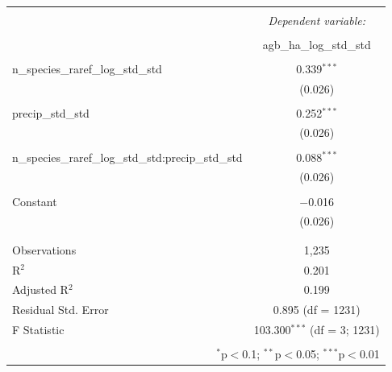 
\begin{table}[!htbp] \centering 
  \caption{} 
  \label{mois_div_int_mod} 
\begin{tabular}{@{\extracolsep{5pt}}lc} 
\\[-1.8ex]\hline 
\hline \\[-1.8ex] 
 & \multicolumn{1}{c}{\textit{Dependent variable:}} \\ 
\cline{2-2} 
\\[-1.8ex] & agb\_ha\_log\_std\_std \\ 
\hline \\[-1.8ex] 
 n\_species\_raref\_log\_std\_std & 0.339$^{***}$ \\ 
  & (0.026) \\ 
  & \\ 
 precip\_std\_std & 0.252$^{***}$ \\ 
  & (0.026) \\ 
  & \\ 
 n\_species\_raref\_log\_std\_std:precip\_std\_std & 0.088$^{***}$ \\ 
  & (0.026) \\ 
  & \\ 
 Constant & $-$0.016 \\ 
  & (0.026) \\ 
  & \\ 
\hline \\[-1.8ex] 
Observations & 1,235 \\ 
R$^{2}$ & 0.201 \\ 
Adjusted R$^{2}$ & 0.199 \\ 
Residual Std. Error & 0.895 (df = 1231) \\ 
F Statistic & 103.300$^{***}$ (df = 3; 1231) \\ 
\hline 
\hline \\[-1.8ex] 
\multicolumn{2}{r}{$^{*}$p$<$0.1; $^{**}$p$<$0.05; $^{***}$p$<$0.01} \\ 
\end{tabular} 
\end{table} 
